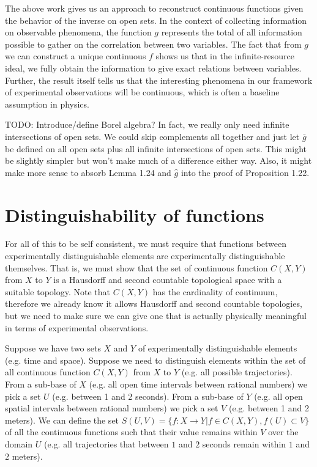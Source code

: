 \documentclass[11pt,letterpaper,fleqn]{memoir} %
\begin{document}
The above work gives us an approach to reconstruct continuous functions given the behavior of the inverse on open sets. In the context of collecting information on observable phenomena, the function $g$ represents the total of all information possible to gather on the correlation between two variables. The fact that from $g$ we can construct a unique continuous $f$ shows us that in the infinite-resource ideal, we fully obtain the information to give exact relations between variables. Further, the result itself tells us that the interesting phenomena in our framework of experimental observations will be continuous, which is often a baseline assumption in physics. 





TODO: Introduce/define Borel algebra? In fact, we really only need infinite intersections of open sets. We could skip complements all together and just let $\bar{g}$ be defined on all open sets plus all infinite intersections of open sets. This might be slightly simpler but won't make much of a difference either way. Also, it might make more sense to absorb Lemma 1.24 and $\hat{g}$ into the proof of Proposition 1.22. 

\section{Distinguishability of functions}

For all of this to be self consistent, we must require that functions between experimentally distinguishable elements are  experimentally distinguishable themselves. That is, we must show that the set of continuous function $C(X,Y)$ from $X$ to $Y$ is a Hausdorff and second countable topological space with a suitable topology. Note that $C(X,Y)$ has the cardinality of continuum, therefore we already know it allows Hausdorff and second countable topologies, but we need to make sure we can give one that is actually physically meaningful in terms of experimental observations.

Suppose we have two sets $X$ and $Y$ of experimentally distinguishable elements (e.g. time and space). Suppose we need to distinguish elements within the set of all continuous function $C(X,Y)$ from $X$ to $Y$ (e.g. all possible trajectories). From a sub-base of $X$ (e.g. all open time intervals between rational numbers) we pick a set $U$ (e.g. between 1 and 2 seconds). From a sub-base of $Y$ (e.g. all open spatial intervals between rational numbers) we pick a set $V$ (e.g. between 1 and 2 meters). We can define the set $S(U,V) = \{f: X \rightarrow Y | f \in C(X,Y), f(U) \subset V\}$ of all the continuous functions such that their value remains within $V$ over the domain $U$ (e.g. all trajectories that between $1$ and $2$ seconds remain within $1$ and $2$ meters).
\end{document}
